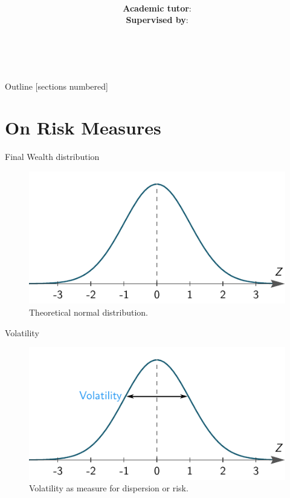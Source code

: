\documentclass[10pt]{beamer}
\title{
  \mytitle \\
}
\author{
  \emph{\myauthor} \\[2.0cm]
  \small \textbf{Academic tutor}: \mytutor \\
  \small \textbf{Supervised by}: \mysupervisor \\
}
\date{
  \mydate \\
}
\begin{document}
\maketitle

\begin{frame}{Outline}
  [sections numbered]
  \tableofcontents[hideallsubsections]
\end{frame}

\section{On Risk Measures}

\begin{frame}[fragile]{Final Wealth distribution}
  \begin{figure}[h]
    \centering
    \includegraphics[scale=1]{none.pdf}
    \caption{Theoretical normal distribution.}
    \label{fig:volatility}
  \end{figure}
\end{frame}

\begin{frame}[fragile]{Volatility}

  \begin{figure}[h]
    \centering
    \includegraphics[scale=1]{volatility.pdf}
    \caption{Volatility as measure for dispersion or risk.}
    \label{fig:volatility}
\end{figure}
\end{frame}
\end{document}

